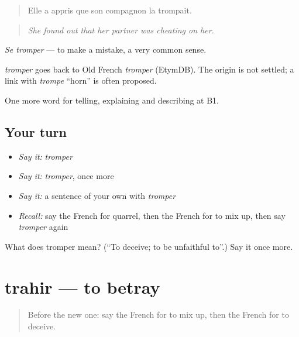 \begin{quote}
Elle a appris que son compagnon la trompait.
\end{quote}

\begin{quote}
\emph{She found out that her partner was cheating on her.}
\end{quote}

\emph{Se tromper} — to make a mistake, a very common sense.

\begin{cousinweb}
\emph{tromper} goes back to Old French \emph{tromper} (EtymDB). The origin is not settled; a link with \emph{trompe} \textquotedblleft{}horn\textquotedblright{} is often proposed.
\end{cousinweb}

\begin{grammarlens}[title={What you've built}]
One more word for telling, explaining and describing at B1.
\end{grammarlens}

\subsection*{Your turn}
\begin{itemize}
\raggedright
  \item \emph{Say it:} \emph{tromper}
  \item \emph{Say it:} \emph{tromper}, once more
  \item \emph{Say it:} a sentence of your own with \emph{tromper}
  \item \emph{Recall:} say the French for quarrel, then the French for to mix up, then say \emph{tromper} again
\end{itemize}

\begin{tcolorbox}[breakable,colback=teal!4,colframe=teal!35!black,title={Before you move on}]
What does tromper mean? (\textquotedblleft{}To deceive; to be unfaithful to\textquotedblright{}.) Say it once more.
\end{tcolorbox}
\section[trahir]{trahir — to betray}

\label{lesson:FR-C495-trahir}



\begin{quote}
Before the new one: say the French for to mix up, then the French for to deceive.
\end{quote}

